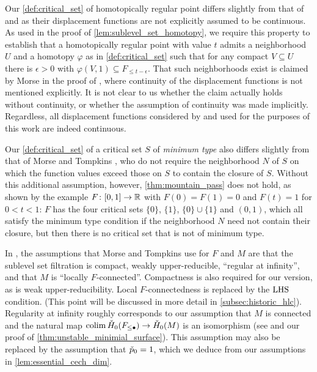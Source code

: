\begin{rem}\label{rem:critical_set}
    Our \cref{def:critical_set} of homotopically regular point differs slightly from that of \citet[p.~30]{Morse.1938} and \citet[p.~444--445]{Morse.1939} as their displacement functions are not explicitly assumed to be continuous.
    As used in the proof of \cref{lem:sublevel_set_homotopy}, we require this property to establish that a homotopically regular point with value $t$ admits a neighborhood $U$ and a homotopy $\varphi$ as in \cref{def:critical_set} such that for any compact $V \subseteq U$ there is $\epsilon > 0$ with $\varphi(V, 1) \subseteq F_{\leq t - \epsilon}$.
    That such neighborhoods exist is claimed by Morse in the proof of \cite[Lemma~8.1]{Morse.1938}, where continuity of the displacement functions is not mentioned explicitly.
    It is not clear to us whether the claim actually holds without continuity, or whether the assumption of continuity was made implicitly.
    Regardless, all displacement functions considered by \citet{Morse.1939} and used for the purposes of this work are indeed continuous.

	Our \cref{def:critical_set} of a critical set $S$ of \emph{minimum type} also differs slightly from that of Morse and Tompkins \cite[p.~466]{Morse.1939}, who do not require the neighborhood $N$ of $S$ on which the function values exceed those on $S$ to contain the closure of $S$.
	Without this additional assumption, however, \cref{thm:mountain_pass} does not hold, as shown by the example $F \colon [0,1] \to \mathbb{R}$ with $F(0) = F(1) = 0$ and $F(t) = 1$ for $0 < t < 1$:
	$F$ has the four critical sets $\{0\}$, $\{1\}$, $\{0\} \cup \{1\}$ and $(0,1)$, which all satisfy the minimum type condition if the neighborhood $N$ need not contain their closure, but then there is no critical set that is not of minimum type.
\end{rem}

\begin{rem}\label{rem:mountain_pass_assumptions}
	In \cite[Corollary 7.1]{Morse.1939}, the assumptions that Morse and Tompkins use for $F$ and $M$ are that the sublevel set filtration is compact,  weakly upper-reducible, ``regular at infinity'', and that $M$ is ``locally $F$-connected''.
	Compactness is also required for our version, as is weak upper-reducibility.
	Local $F$-connectedness is replaced by the $\mathrm{LHS}$ condition.
	(This point will be discussed in more detail in \cref{subsec:historic_hlc}).
	Regularity at infinity roughly corresponds to our assumption that $M$ is connected and the natural map $\operatorname*{colim} \check{H}_0(F_{\leq \bullet}) \to \check{H}_0(M)$ is an isomorphism (see \cite[p.~444]{Morse.1939} and our proof of \cref{thm:unstable_minimial_surface}).
	This assumption may also be replaced by the assumption that $\check{p}_0 = 1$, which we deduce from our assumptions in \cref{lem:essential_cech_dim}.
\end{rem}


